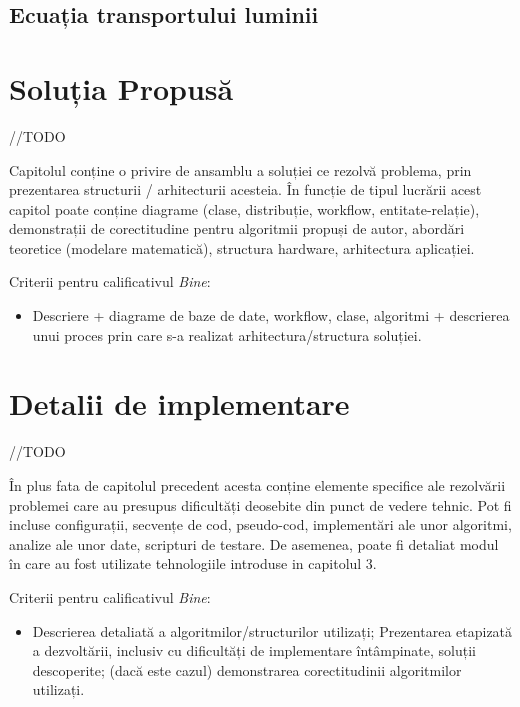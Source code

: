 \documentclass[12pt,a4paper]{report}
\numberwithin{equation}{section} %
\begin{document}
\section{Ecuația transportului luminii}



\chapter{\label{sec:solutie}Soluția Propusă}

//TODO

Capitolul conține o privire de ansamblu a soluției ce rezolvă problema, prin prezentarea structurii / arhitecturii acesteia. În funcție de tipul lucrării acest capitol poate conține diagrame (clase, distribuție, workflow, entitate-relație), demonstrații de corectitudine pentru algoritmii propuși de autor, abordări teoretice (modelare matematică), structura hardware, arhitectura aplicației.

Criterii pentru calificativul \textit{Bine}:
\begin{itemize}
	\item 	Descriere + diagrame de baze de date, workflow, clase, algoritmi + descrierea unui proces prin care s-a realizat arhitectura/structura soluției.
\end{itemize}

\chapter{\label{sec:implementare}Detalii de implementare}

//TODO

În plus fata de capitolul precedent acesta conține elemente specifice ale rezolvării problemei care au presupus dificultăți deosebite din punct de vedere tehnic. Pot fi incluse configurații, secvențe de cod, pseudo-cod, implementări ale unor algoritmi, analize ale unor date, scripturi de testare. De asemenea, poate fi detaliat modul în care au fost utilizate tehnologiile introduse in capitolul 3.


Criterii pentru calificativul \textit{Bine}:
\begin{itemize}
	\item	Descrierea detaliată a algoritmilor/structurilor utilizați; Prezentarea etapizată a dezvoltării, inclusiv cu dificultăți de implementare întâmpinate, soluții descoperite; (dacă este cazul) demonstrarea corectitudinii algoritmilor utilizați.
\end{itemize}
\end{document}

